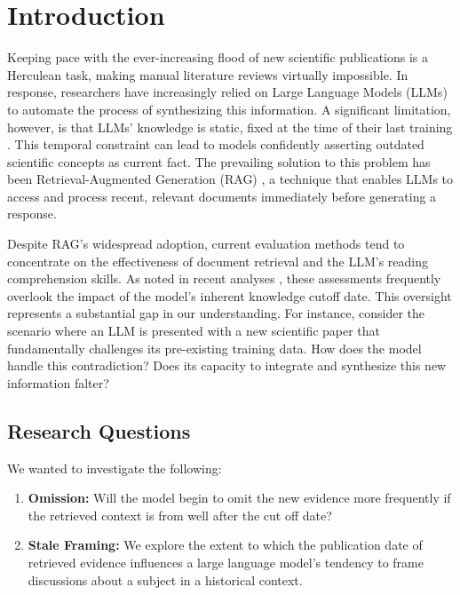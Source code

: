 \documentclass[acmsmall,screen,nonacm]{acmart}
\begin{document}


\maketitle

\section{Introduction} \label{sec:intro}

Keeping pace with the ever-increasing flood of new scientific publications is a Herculean task, making manual literature reviews virtually impossible. In response, researchers have increasingly relied on Large Language Models (LLMs) to automate the process of synthesizing this information. A significant limitation, however, is that LLMs' knowledge is static, fixed at the time of their last training \cite{lazaridou2021mind}. This temporal constraint can lead to models confidently asserting outdated scientific concepts as current fact. The prevailing solution to this problem has been Retrieval-Augmented Generation (RAG) \cite{lewis2020retrieval}, a technique that enables LLMs to access and process recent, relevant documents immediately before generating a response.

Despite RAG's widespread adoption, current evaluation methods tend to concentrate on the effectiveness of document retrieval and the LLM's reading comprehension skills. As noted in recent analyses \cite{gao2023retrieval}, these assessments frequently overlook the impact of the model's inherent knowledge cutoff date. This oversight represents a substantial gap in our understanding. For instance, consider the scenario where an LLM is presented with a new scientific paper that fundamentally challenges its pre-existing training data. How does the model handle this contradiction? Does its capacity to integrate and synthesize this new information falter?

\subsection{Research Questions} \label{subsec:research_questions}
We wanted to investigate the following:
\begin{enumerate}
\item \textbf{Omission:} Will the model begin to omit the new evidence more frequently if the retrieved context is from well after the cut off date?
\item \textbf{Stale Framing:} We explore the extent to which the publication date of retrieved evidence influences a large language model's tendency to frame discussions about a subject in a historical context.
\end{enumerate}
\end{document}
